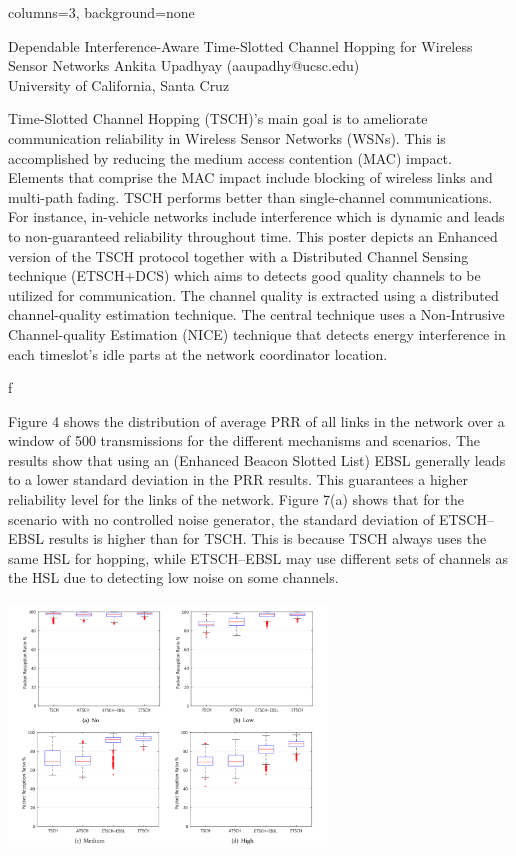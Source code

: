 \documentclass[portrait,paperwidth=91cm,paperheight=121cm,fontscale=0.35]{baposter} %
\begin{document}
\begin{poster}{columns=3, background=none}

{Dependable Interference-Aware Time-Slotted Channel Hopping for Wireless Sensor Networks}
{Ankita Upadhyay   (aaupadhy@ucsc.edu)\\University of California, Santa Cruz}

{ Time-Slotted Channel Hopping (TSCH)'s main goal is to ameliorate communication reliability in Wireless Sensor Networks (WSNs). This is accomplished by reducing the medium access contention (MAC) impact. Elements that comprise the MAC impact include blocking of wireless links and multi-path fading. TSCH performs better than single-channel communications. For instance, in-vehicle networks include interference which is dynamic and leads to non-guaranteed reliability throughout time. This poster depicts an Enhanced version of the TSCH protocol together with a Distributed Channel Sensing technique (ETSCH+DCS) which aims to detects good quality channels to be utilized for communication. The channel quality is extracted using a distributed channel-quality estimation technique. The central technique uses a Non-Intrusive Channel-quality Estimation (NICE) technique that detects energy interference in each timeslot's idle parts at the network coordinator location. 
}

f
{Figure 4 shows the distribution
of average PRR of all links in the network over a window of 500 transmissions for the different
mechanisms and scenarios. The results show that using an (Enhanced Beacon Slotted List) EBSL generally leads to a lower standard
deviation in the PRR results. This guarantees a higher reliability level for the links of the network.
Figure 7(a) shows that for the scenario with no controlled noise generator, the standard deviation
of ETSCH–EBSL results is higher than for TSCH. This is because TSCH always uses the same HSL
for hopping, while ETSCH–EBSL may use different sets of channels as the HSL due to detecting low
noise on some channels.
 
     \centering
     \includegraphics[height=6.5cm, width=\textwidth]{fourgraphs1.png}
      \caption{Figure 4: PRR distribution of all network links, over a window of 500 transmissions}

}
\end{poster}
\end{document}
